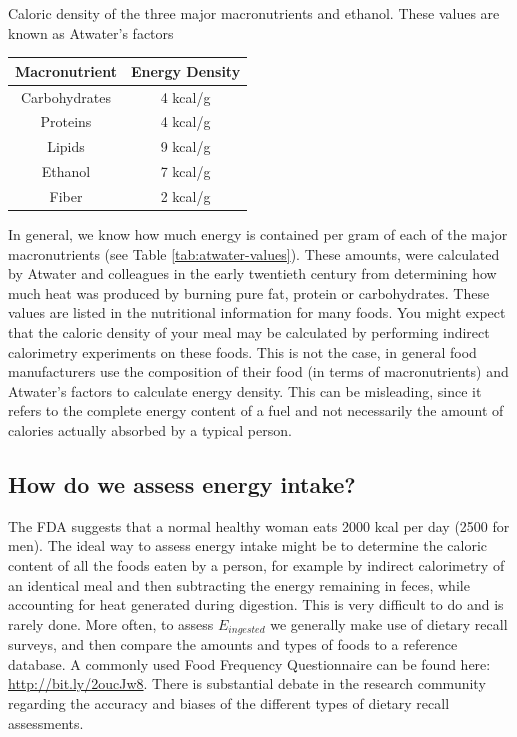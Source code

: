 \documentclass{tufte-handout}
\begin{document}
\begin{margintable}
\centering
\caption{Caloric density of the three major macronutrients and ethanol.  These values are known as Atwater's factors}
\label{tab:atwater-values}
\begin{tabular}{cc}
\hline
\textbf{Macronutrient}       & \textbf{Energy Density}                     \\
\hline
Carbohydrates & 4 kcal/g \\
Proteins & 4 kcal/g \\
Lipids & 9 kcal/g \\
Ethanol & 7 kcal/g \\
Fiber & 2 kcal/g \\

\hline
\end{tabular}
\end{margintable}

In general, we know how much energy is contained per gram of each of the major macronutrients (see Table \ref{tab:atwater-values}).  These amounts, were calculated by Atwater and colleagues in the early twentieth century from determining how much heat was produced by burning pure fat, protein or carbohydrates.  These values are listed in the nutritional information for many foods.  You might expect that the caloric density of your meal may be calculated by performing indirect calorimetry experiments on these foods.  This is not the case, in general food manufacturers use the composition of their food (in terms of macronutrients) and Atwater's factors to calculate energy density.  This can be misleading, since it refers to the complete energy content of a fuel and not necessarily the amount of calories actually absorbed by a typical person.  

\subsection{How do we assess energy intake?}

The FDA suggests that a normal healthy woman eats 2000 kcal per day (2500 for men).  The ideal way to assess energy intake might be to determine the caloric content of all the foods eaten by a person, for example by indirect calorimetry of an identical meal and then subtracting the energy remaining in feces, while accounting for heat generated during digestion.  This is very difficult to do and is rarely done.   More often, to assess $E_{ingested}$ we generally make use of dietary recall surveys, and then compare the amounts and types of foods to a reference database.  A commonly used Food Frequency Questionnaire can be found here: \url{http://bit.ly/2oucJw8}.  There is substantial debate in the research community regarding the accuracy and biases of the different types of dietary recall assessments.
\end{document}
